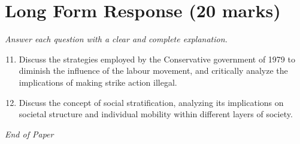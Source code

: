 \documentclass[12pt]{article}
\begin{document}
\section*{Long Form Response (20 marks)}
\textit{Answer each question with a clear and complete explanation.}
\begin{enumerate}[label=\arabic*.]
\setcounter{enumi}{10}
\item Discuss the strategies employed by the Conservative government of 1979 to diminish the influence of the labour movement, and critically analyze the implications of making strike action illegal.
\item Discuss the concept of social stratification, analyzing its implications on societal structure and individual mobility within different layers of society.
\end{enumerate}

\vfill
\noindent\textit{End of Paper}
\end{document}
